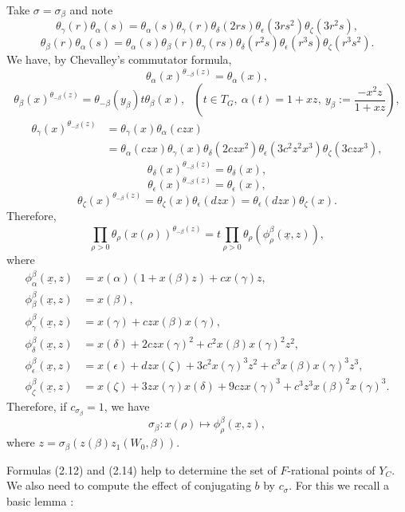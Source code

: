 \documentclass[12pt,letterpaper]{amsart}
\newcommand{\eps}{\epsilon}
\newcommand{\unx}{\underline{x}}
\begin{document}
Take $\sigma =\sigma_\beta$ and note
\[
\theta_\gamma(r)\theta_\alpha (s)=\theta_\alpha (s)\theta_\gamma(r)
\theta_\delta(2rs)\theta_\epsilon(3rs^2)\theta_\zeta(3r^2s),
\]
\[
\theta_\beta(r)\theta_\alpha (s)=\theta_\alpha (s)\theta_\beta(r)
\theta_\gamma(rs)
\theta_\delta(r^2s)\theta_\epsilon(r^3s)\theta_\zeta(r^3s^2).
\]
We have, by Chevalley's commutator formula,
\[
\theta_\alpha(x)^{\theta_{-\beta}(z)}=\theta_\alpha(x),
\]
\[
\theta_\beta(x)^{\theta_{-\beta}(z)}=
\theta_{-\beta}(y_\beta)
t\theta_\beta(x),\ \ \ (t\in T_G ,\
\alpha(t)=1+xz,\  y_\beta:=\frac{-x^2z}{1+xz}),
\]
\[
\begin{split}
\theta_\gamma(x)^{\theta_{-\beta}(z)}
&=\theta_\gamma(x)\theta_\alpha(czx)\\
&=\theta_\alpha(czx)\theta_\gamma(x)\theta_\delta(2czx^2)
\theta_\epsilon(3c^2z^2x^3)\theta_\zeta(3czx^3),
\end{split}
\]
\[
\theta_\delta(x)^{\theta_{-\beta}(z)}=\theta_\delta(x),
\]
\[
\theta_\epsilon(x)^{\theta_{-\beta}(z)}=\theta_\epsilon(x),
\]
\[
\theta_\zeta(x)^{\theta_{-\beta}(z)}=\theta_\zeta(x)\theta_\epsilon(dzx)
=\theta_\epsilon(dzx)\theta_\zeta(x).
\]
Therefore,
\[
\prod_{\rho >0}\theta_\rho(x(\rho))^{\theta_{-\beta}(z)}
=t\prod_{\rho >0}\theta_\rho(\phi_\rho^\beta(\unx,z)),
\tag{2.13}
\]
where
\[
\begin{split}
\phi_\alpha^\beta(\unx,z)
&=x(\alpha)(1+x(\beta)z)+cx(\gamma)z,\\
\phi_\beta^\beta(\unx,z)
&=x(\beta),\\
\phi_\gamma^\beta(\unx,z)
&=x(\gamma)+czx(\beta)x(\gamma),\\
\phi_\delta^\beta(\unx,z)
&=x(\delta)+2czx(\gamma)^2+c^2x(\beta)x(\gamma)^2z^2,\\
\phi_{\eps}^\beta(\unx,z)
&=x(\eps)+dzx(\zeta)+3c^2x(\gamma)^3z^2+c^3x(\beta)x(\gamma)^3z^3,\\
\phi_\zeta^\beta(\unx,z)
&=x(\zeta)+3zx(\gamma)x(\delta)+9czx(\gamma)^3+c^3z^3x(\beta)^2x(\gamma)^3.
\end{split}
\]
Therefore, if $c_{\sigma_\beta}=1$, we have
\[
\sigma_\beta :x(\rho)\longmapsto \phi_\rho^\beta(\unx,z),
\tag{2.14}
\]
where $z=\sigma_\beta(z(\beta)z_1(W_0,\beta))$.

Formulas (2.12) and (2.14) help to determine the set of $F$-rational
points of $Y_C$. We also need to compute the effect of conjugating $b$ by
$c_\sigma$. For this we recall a basic lemma \cite{Ca89}:
\end{document}
